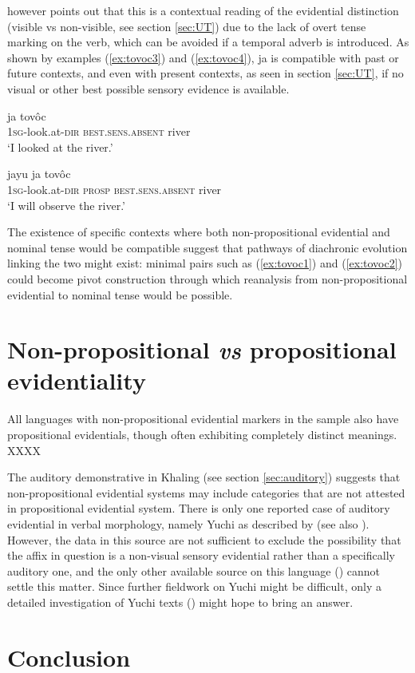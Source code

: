 \documentclass[oneside,a4paper,11pt]{article}
\newcommand{\ipa}[1]{{\phon \mbox{#1}}} %
\begin{document}
\citet{gutierrez14determiners} however points out that this is a contextual reading of the evidential distinction (visible vs non-visible, see section \ref{sec:UT}) due to the lack of overt tense marking on the verb, which can be avoided if a temporal adverb is introduced. As shown by examples (\ref{ex:tovoc3}) and (\ref{ex:tovoc4}), \ipa{ja} is compatible with past or future contexts, and even with present contexts, as seen in section \ref{sec:UT}, if no visual or other best possible sensory evidence is available.


\begin{exe}
\ex \label{ex:tovoc3}
\gll \ipa{j-ovalh-ei} \ipa{ja} \ipa{tovôc} \\
 \textsc{1sg}-look.at-\textsc{dir} \textsc{best.sens.absent} river \\
\glt `I looked at the river.'
\end{exe}

\begin{exe}
\ex \label{ex:tovoc4}
\gll \ipa{j-ovalh-ei}  \ipa{jayu}   \ipa{ja} \ipa{tovôc} \\
 \textsc{1sg}-look.at-\textsc{dir} \textsc{prosp} \textsc{best.sens.absent} river \\
\glt `I will observe the river.'
\end{exe}

The existence of specific contexts where both non-propositional evidential and nominal tense would be compatible suggest that  pathways of diachronic evolution linking the two might exist: minimal pairs such as (\ref{ex:tovoc1}) and (\ref{ex:tovoc2}) could become pivot construction through which reanalysis from non-propositional evidential to nominal tense would be possible.

\section{Non-propositional \textit{vs} propositional evidentiality}
 All languages with non-propositional evidential markers in the sample also have propositional evidentials, though often exhibiting completely distinct meanings. XXXX


The auditory demonstrative in Khaling (see section \ref{sec:auditory}) suggests that non-propositional evidential systems may include categories that are not attested in propositional evidential system. There is only one reported case of auditory evidential in verbal morphology, namely  Yuchi as described by \citet{linn01euchee} (see also \citealt[37]{aikhenvald06}). However, the data in this source are not sufficient to exclude the possibility that the affix in question is a non-visual sensory evidential rather than a specifically auditory one, and the only other available source on this language (\citealt{wagner38yuchi}) cannot settle this matter. Since further fieldwork on Yuchi might be difficult, only a detailed investigation of Yuchi texts (\citealt{wagner31tales}) might hope to bring an answer.
\section{Conclusion}




\end{document}
